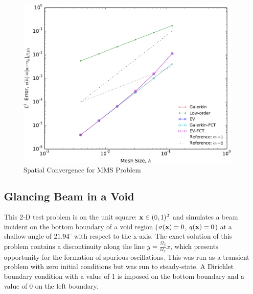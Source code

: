 \begin{figure}[htb]
   \centering
      \includegraphics[width=\textwidth]
        {images/convergence_sinx.pdf}
      \caption{Spatial Convergence for MMS Problem}
   \label{fig:mms_sinx_ss}
\end{figure}
\clearpage
\subsection{Glancing Beam in a Void}
This 2-D test problem is on the unit square: $\mathbf{x}\in(0,1)^2$ and simulates
a beam incident on the bottom boundary of a void region
($\sigma(\mathbf{x})= 0$, $q(\mathbf{x})=0$) at a shallow angle of
$21.94^\circ$ with respect to the x-axis.
The exact solution of this problem contains a discontinuity along the line
$y = \frac{\Omega_y}{\Omega_x}x$, which presents opportunity for the formation
of spurious oscillations.
This was run as a transient problem with zero initial conditions but was run to
steady-state. A Dirichlet
boundary condition with a value of 1 is imposed on the bottom boundary
and a value of 0 on the left boundary.

